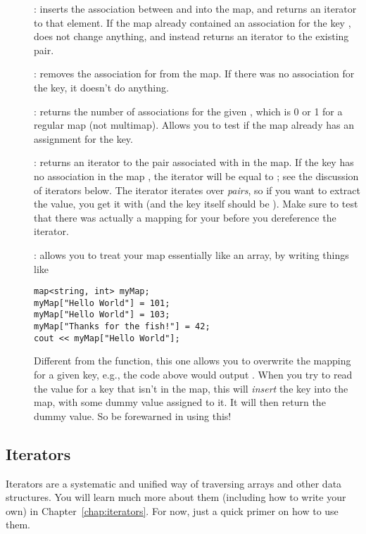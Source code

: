 \begin{description}
\item[]: inserts the association
  between  and  into the map, and returns
  an iterator to that element. If the map already contained an
  association for the key ,  does not
  change anything, and instead returns an iterator to the existing pair.
\item[]: removes the association for
   from the map. If there was no association for the key, it
  doesn't do anything.
\item[]: returns the number of
  associations for the given , which is 0 or 1 for a regular
  map (not multimap). Allows you to test if the map already has an
  assignment for the key.
\item[]: returns an iterator to the
  pair  associated with  in the map. 
  If the key has no association in the map , the iterator will
  be equal to ; see the discussion of iterators below.
  The iterator iterates over \emph{pairs}, so if you want to extract
  the value, you get it with  (and the
  key itself should be ). Make sure to test
  that there was actually a mapping for your  before you
  dereference the iterator.
\item[]: allows you to
  treat your map essentially like an array, by writing things like
\begin{verbatim}
map<string, int> myMap;
myMap["Hello World"] = 101;
myMap["Hello World"] = 103;
myMap["Thanks for the fish!"] = 42;
cout << myMap["Hello World"];
\end{verbatim}
  Different from the  function, this one allows you to
  overwrite the mapping for a given key, e.g., the code above would
  output . When you try to read the value for a key that
  isn't in the map, this will \emph{insert} the key into the map, with
  some dummy value assigned to it. It will then return the dummy
  value. So be forewarned in using this!
\end{description}

\subsection{Iterators}
Iterators are a systematic and unified way of traversing arrays and
other data structures. You will learn much more about them (including
how to write your own) in Chapter~\ref{chap:iterators}. For now, just
a quick primer on how to use them.


